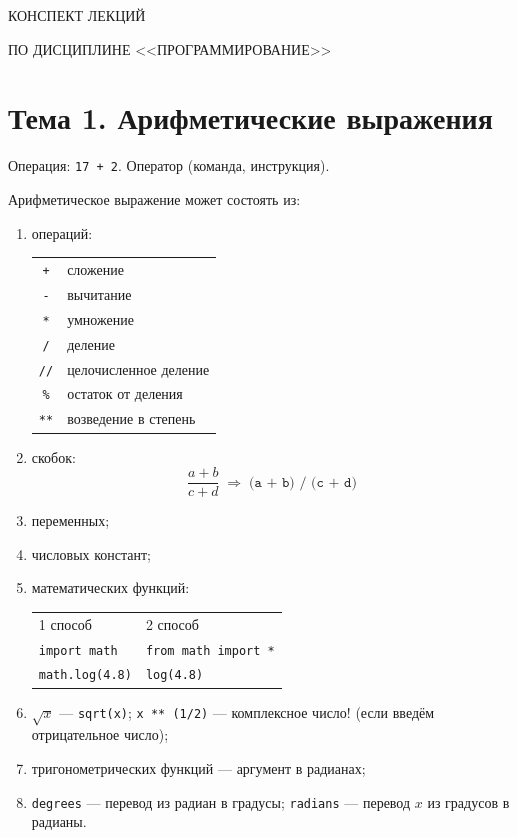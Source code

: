 \documentclass[a4paper, 12pt]{article}
\begin{document}
\begin{center}
{\large КОНСПЕКТ ЛЕКЦИЙ}

ПО ДИСЦИПЛИНЕ <<ПРОГРАММИРОВАНИЕ>>
\tableofcontents
\label{contents}

\pagebreak

\end{center}
\vspace{10pt}

\section{Тема 1. Арифметические выражения}

Операция: \texttt{17 + 2}. Оператор (команда, инструкция).

Арифметическое выражение может состоять из:
\begin{enumerate}[noitemsep, label=\arabic*)]
  \item операций:
    \begin{center}
    \begin{tabular}{cl}
      \texttt{+}  & сложение \\
      \texttt{-}  & вычитание \\
      \texttt{*}  & умножение \\
      \texttt{/}  & деление \\
      \texttt{//} & целочисленное деление \\
      \texttt{\%} & остаток от деления \\
      \texttt{**} & возведение в степень \\
    \end{tabular}
    \end{center}
  \item скобок:
    \[
      \frac{a + b}{c + d} \;\Longrightarrow\; \texttt{(a + b) / (c + d)}
    \]
  \item переменных;
  \item числовых констант;
  \item математических функций:
    \begin{center}
    \begin{tabular}{ll}
      1 способ & 2 способ \\
      \texttt{import math} & \texttt{from math import *} \\
      \texttt{math.log(4.8)} & \texttt{log(4.8)} \\
    \end{tabular}
    \end{center}
  \item $\sqrt{x}$ --- \texttt{sqrt(x)}; \quad \texttt{x ** (1/2)} --- комплексное число!
    (если введём отрицательное число);
  \item тригонометрических функций --- аргумент в радианах;
  \item \texttt{degrees} --- перевод из радиан в градусы;
    \texttt{radians} --- перевод $x$ из градусов в радианы.
\end{enumerate}
\end{document}
